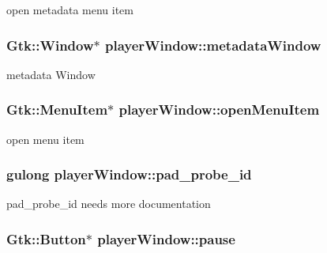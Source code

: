 open metadata menu item \hypertarget{classplayerWindow_af3ee59341eb072dc78e0b01708b96fc3}{
\subsubsection[{metadata\-Window}]{\setlength{\rightskip}{0pt plus 5cm}Gtk\-::\-Window$\ast$ player\-Window\-::metadata\-Window\hspace{0.3cm}{\ttfamily [protected]}}}\label{classplayerWindow_af3ee59341eb072dc78e0b01708b96fc3}
metadata Window \hypertarget{classplayerWindow_a01aafd36eea007874231bfac245dd21d}{
\subsubsection[{open\-Menu\-Item}]{\setlength{\rightskip}{0pt plus 5cm}Gtk\-::\-Menu\-Item$\ast$ player\-Window\-::open\-Menu\-Item\hspace{0.3cm}{\ttfamily [protected]}}}\label{classplayerWindow_a01aafd36eea007874231bfac245dd21d}
open menu item \hypertarget{classplayerWindow_a8fac0f03b04cf448f785d9130cafd2e2}{
\subsubsection[{pad\-\_\-probe\-\_\-id}]{\setlength{\rightskip}{0pt plus 5cm}gulong player\-Window\-::pad\-\_\-probe\-\_\-id\hspace{0.3cm}{\ttfamily [protected]}}}\label{classplayerWindow_a8fac0f03b04cf448f785d9130cafd2e2}
pad\-\_\-probe\-\_\-id needs more documentation \hypertarget{classplayerWindow_aeb53d8b331ccfaba331014ff31906900}{
\subsubsection[{pause}]{\setlength{\rightskip}{0pt plus 5cm}Gtk\-::\-Button$\ast$ player\-Window\-::pause\hspace{0.3cm}{\ttfamily [protected]}}}\label{classplayerWindow_aeb53d8b331ccfaba331014ff31906900}
